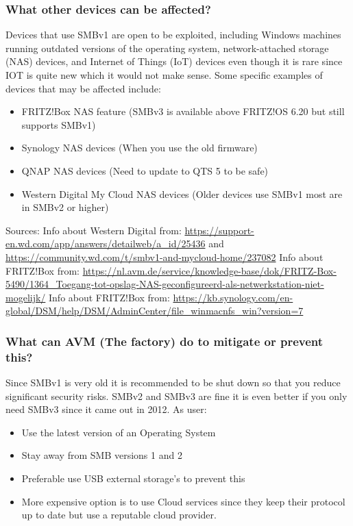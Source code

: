 \documentclass[12pt, letterpaper]{article}
\begin{document}
\subsubsection{What other devices can be affected?}
Devices that use SMBv1 are open to be exploited, including Windows machines running outdated versions of the operating system, network-attached storage (NAS) devices, and Internet of Things (IoT) devices even though it is rare since IOT is quite new which it would not make sense. Some specific examples of devices that may be affected include:

\begin{itemize}
\item FRITZ!Box NAS feature (SMBv3 is available above FRITZ!OS 6.20 but still supports SMBv1)
\item Synology NAS devices (When you use the old firmware)
\item QNAP NAS devices (Need to update to QTS 5 to be safe)
\item Western Digital My Cloud NAS devices (Older devices use SMBv1 most are in SMBv2 or higher)
\end{itemize}
\hfill\break
Sources:
\hfill\break
Info about Western Digital from: \url{https://support-en.wd.com/app/answers/detailweb/a_id/25436} and \url{https://community.wd.com/t/smbv1-and-mycloud-home/237082}
\hfill\break
Info about FRITZ!Box from: \url{https://nl.avm.de/service/knowledge-base/dok/FRITZ-Box-5490/1364_Toegang-tot-opslag-NAS-geconfigureerd-als-netwerkstation-niet-mogelijk/}
\hfill\break
Info about FRITZ!Box from: \url{https://kb.synology.com/en-global/DSM/help/DSM/AdminCenter/file_winmacnfs_win?version=7}

\newpage
\subsubsection{What can AVM (The factory) do to mitigate or prevent this?}
Since SMBv1 is very old it is recommended to be shut down so that you reduce significant security risks. SMBv2 and SMBv3 are fine it is even better if you only need SMBv3 since it came out in 2012.
\hfill\break
\hfill\break
As user:
\begin{itemize}
    \item Use the latest version of an Operating System
    \item Stay away from SMB versions 1 and 2
    \item Preferable use USB external storage's to prevent this
    \item More expensive option is to use Cloud services since they keep their protocol up to date but use a reputable cloud provider.
\end{itemize}
\end{document}
